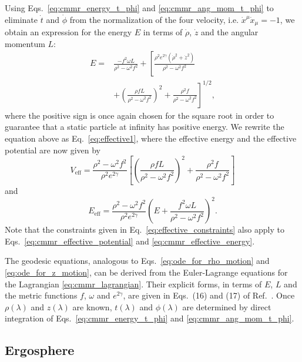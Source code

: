 Using Eqs.~\eqref{eq:cmmr_energy_t_phi} and \eqref{eq:cmmr_ang_mom_t_phi} to eliminate $\dot{t}$ and $\dot{\phi}$ from the normalization of the four velocity, i.e. $\dot{x}^\mu\dot{x}_\mu = -1$, we obtain an expression for the energy $E$ in  terms of $\dot{\rho}$, $\dot{z}$ and the angular momentum $L$:
%
\begin{align}
  E  = & \frac{-f^2\omega L}{\rho^2-\omega^2 f^2}  + \left[ \frac{\rho^2e^{2\gamma}(\dot{\rho}^2 + \dot{z}^2)}{\rho^2 - \omega^2f^2}  \right. \nonumber \\
       & \left. + \left( \frac{\rho fL}{\rho^2 - \omega^2f^2} \right)^2 + \frac{\rho^2f}{\rho^2 - \omega^2f^2} \right]^{1/2},
  \label{eq:cmmr_energy_rho_z}
\end{align}
%
where the positive sign is once again chosen for the square root in order to guarantee that a static particle at infinity has positive energy. We rewrite the equation above as Eq.~\eqref{eq:effective1}, where the effective energy and the effective potential are now given by
%
\begin{equation}
  V_{\text{eff}} = \frac{\rho^2 - \omega^2 f^2}{\rho^2 e^{2\gamma}}\left[ \left( \frac{\rho fL}{\rho^2 - \omega^2f^2} \right)^2 + \frac{\rho^2f}{\rho^2 - \omega^2f^2}\right]
  \label{eq:cmmr_effective_potential}
\end{equation}
%
and
%
\begin{equation}
  E_{\text{eff}} = \frac{\rho^2 - \omega^2 f^2}{\rho^2 e^{2\gamma}}\left(E + \frac{f^2\omega L}{\rho^2-\omega^2 f^2}\right)^2.
  \label{eq:cmmr_effective_energy}
\end{equation}
%
%
Note that the constraints given in Eq.~\eqref{eq:effective_constraints} also apply to Eqs.~\eqref{eq:cmmr_effective_potential} and \eqref{eq:cmmr_effective_energy}.

The geodesic equations, analogous to Eqs.~\eqref{eq:ode_for_rho_motion} and \eqref{eq:ode_for_z_motion}, can be derived from the Euler-Lagrange equations for the Lagrangian \eqref{eq:cmmr_lagrangian}. Their explicit forms, in terms of $E$, $L$ and the metric functions $f$, $\omega$ and $e^{2\gamma}$, are given in Eqs.~(16) and (17) of Ref.~\cite{Dubeibe2016}. Once $\rho(\lambda)$ and $z(\lambda)$ are known, $t(\lambda)$ and $\phi(\lambda)$ are determined by direct integration of Eqs.~\eqref{eq:cmmr_energy_t_phi} and \eqref{eq:cmmr_ang_mom_t_phi}.


\subsection{Ergosphere}

